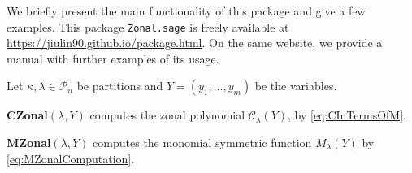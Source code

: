 \documentclass[smallextended]{svjour3}
\begin{document}
We briefly present the main functionality of this package and give a few examples. This package \texttt{Zonal.sage} is freely available at
\url{https://jiulin90.github.io/package.html}.  On the same website, we provide a
manual with further examples of its usage.

Let $\kappa, \lambda\in\mathcal{P}_n$ be partitions and $Y=(y_1,\ldots,y_m)$ be the variables.
\vspace{10bp}

\noindent \textbf{CZonal}$(\lambda, Y)$
computes the zonal polynomial $\mathcal{C}_{\lambda}(Y)$, by \eqref{eq:CInTermsOfM}.

\noindent{}



\vspace{5bp}

\noindent \textbf{MZonal}$(\lambda,Y)$
computes the monomial symmetric function $M_{\lambda}(Y)$ 
by \eqref{eq:MZonalComputation}.
\end{document}
